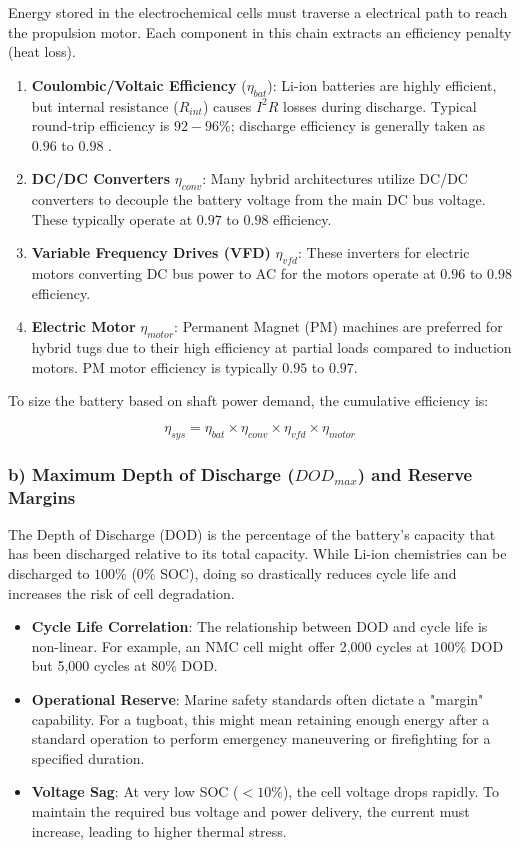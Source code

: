 Energy stored in the electrochemical cells must traverse a electrical path to reach the propulsion motor. Each component in this chain extracts an efficiency penalty (heat loss).

\begin{enumerate}
	\item \textbf{Coulombic/Voltaic Efficiency} ($\eta_{bat}$): Li-ion batteries are highly efficient, but internal resistance ($R_{int}$) causes $I^2R$ losses during discharge. Typical round-trip efficiency is $92-96\%$; discharge efficiency is generally taken as $0.96$ to $0.98$ \cite{BattUniversity}.
	\item \textbf{DC/DC Converters} $\eta_{conv}$:  Many hybrid architectures utilize DC/DC converters to decouple the battery voltage from the main DC bus voltage. These typically operate at $0.97$ to $0.98$ efficiency.
	\item \textbf{Variable Frequency Drives (VFD)} $\eta_{vfd}$: These inverters for electric motors  converting DC bus power to AC for the motors operate at $0.96$ to $0.98$ efficiency.
	\item \textbf{Electric Motor} $\eta_{motor}$: Permanent Magnet (PM) machines are preferred for hybrid tugs due to their high efficiency at partial loads compared to induction motors. PM motor efficiency is typically $0.95$ to $0.97$.
\end{enumerate}

To size the battery based on shaft power demand, the cumulative efficiency is:

\begin{equation}
\eta_{sys} = \eta_{bat} \times \eta_{conv} \times \eta_{vfd} \times \eta_{motor}
\end{equation}

\subsubsection{b) Maximum Depth of Discharge ($DOD_{max}$) and Reserve Margins}

The Depth of Discharge (DOD) is the percentage of the battery's capacity that has been discharged relative to its total capacity. While Li-ion chemistries can be discharged to $100\%$ ($0\%$ SOC), doing so drastically reduces cycle life and increases the risk of cell degradation.

\begin{itemize}
	\item  \textbf{Cycle Life Correlation}: The relationship between DOD and cycle life is non-linear. For example, an NMC cell might offer 2,000 cycles at $100\%$ DOD but 5,000 cycles at $80\%$ DOD.
	\item \textbf{Operational Reserve}: Marine safety standards often dictate a "margin" capability. For a tugboat, this might mean retaining enough energy after a standard operation to perform emergency maneuvering or firefighting for a specified duration.
	\item \textbf{Voltage Sag}: At very low SOC ($<10\%$), the cell voltage drops rapidly. To maintain the required bus voltage and power delivery, the current must increase, leading to higher thermal stress.
\end{itemize}

